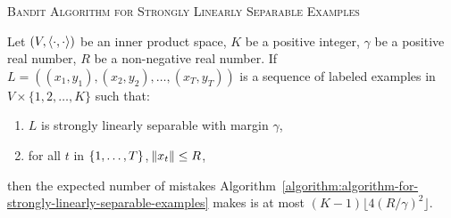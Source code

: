 \begin{algorithm}[h]
\caption{\textsc{Bandit Algorithm for Strongly Linearly Separable Examples}
\label{algorithm:algorithm-for-strongly-linearly-separable-examples}}
\begin{algorithmic}[1]
{
\ELSE
{}
\label{line:pos-update}
\ENDIF
\ELSE
{}
\label{line:neg-update}
\ELSE
{}
\ENDIF
\ENDIF
\ENDFOR
}
\end{algorithmic}
\end{algorithm}


\begin{theorem}
\label{theorem:strongly-separable-examples-mistake-upper-bound}
Let $(V, \left\langle \cdot, \cdot \right\rangle)$ be an inner product space, $K$ be a positive
integer, $\gamma$ be a positive real number, $R$ be a non-negative real number. If
$L = ((x_1, y_1), (x_2, y_2), \dots, (x_T, y_T))$ is a sequence of labeled examples in
$V \times \{1,2,\dots,K\}$ such that:
\begin{enumerate}
  \item $L$ is strongly linearly separable with margin $\gamma$,
  \item for all $t$ in $\cbr{1,\ldots,T}$, $\norm{x_t} \le R$,
\end{enumerate}
then the
expected number of mistakes
Algorithm~\ref{algorithm:algorithm-for-strongly-linearly-separable-examples}
makes is at most $(K-1) \lfloor 4(R/\gamma)^2 \rfloor$.
\end{theorem}


